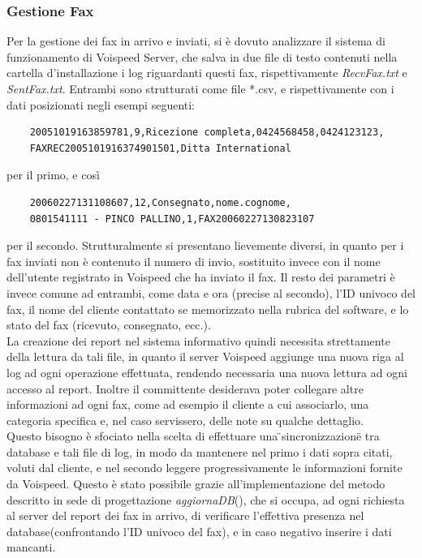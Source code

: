 \subsubsection{Gestione Fax}
Per la gestione dei fax in arrivo e inviati, si \`e dovuto analizzare il sistema di funzionamento di Voispeed Server, che salva in due file di testo contenuti nella cartella d'installazione i log riguardanti questi fax, rispettivamente \textit{RecvFax.txt} e \textit{SentFax.txt}. Entrambi sono strutturati come file *.csv, e rispettivamente con i dati posizionati negli esempi seguenti:
\begin{verbatim}
    20051019163859781,9,Ricezione completa,0424568458,0424123123,
    FAXREC2005101916374901501,Ditta International
\end{verbatim} 
per il primo, e cos\`i
\begin{verbatim}
    20060227131108607,12,Consegnato,nome.cognome,
    0801541111 - PINCO PALLINO,1,FAX20060227130823107
\end{verbatim} 
\noindent per il secondo.
Strutturalmente si presentano lievemente diversi, in quanto per i fax inviati non \`e contenuto il numero di invio, sostituito invece con il nome dell'utente registrato in Voispeed che ha inviato il fax. Il resto dei parametri \`e invece comune ad entrambi, come data e ora (precise al secondo), l'ID univoco del fax, il nome del cliente contattato se memorizzato nella rubrica del software, e lo stato del fax (ricevuto, consegnato, ecc.). \\
La creazione dei report nel sistema informativo quindi necessita strettamente della lettura da tali file, in quanto il server Voispeed aggiunge una nuova riga al log ad ogni operazione effettuata, rendendo necessaria una nuova lettura ad ogni accesso al report. Inoltre il committente desiderava poter collegare altre informazioni ad ogni fax, come ad esempio il cliente a cui associarlo, una categoria specifica e, nel caso servissero, delle note su qualche dettaglio. \\
Questo bisogno \`e sfociato nella scelta di effettuare una \"{}sincronizzazione\"{} tra database e tali file di log, in modo da mantenere nel primo i dati sopra citati, voluti dal cliente, e nel secondo leggere progressivamente le informazioni fornite da Voispeed. Questo \`e stato possibile grazie all'implementazione del metodo descritto in sede di progettazione \textit{aggiornaDB}(), che si occupa, ad ogni richiesta al server del report dei fax in arrivo, di verificare l'effettiva presenza nel database(confrontando l'ID univoco del fax), e in caso negativo inserire i dati mancanti. 


